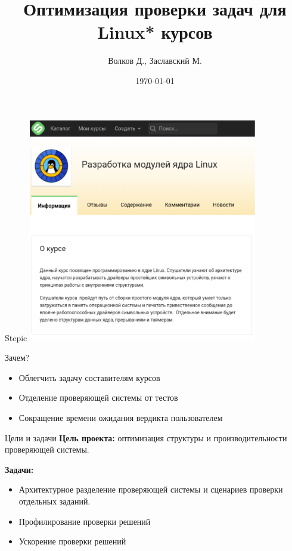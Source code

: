 \documentclass{beamer}
\begin{document}
\title{Оптимизация проверки задач для Linux* курсов}  
\author{Волков Д., Заславский М.}
\date{\today} 
\frame{\titlepage} 

\begin{frame}{Stepic}
	\includegraphics[width=100mm]{./stepic.pdf}
\end{frame}

\begin{frame}{Зачем?}
	\begin{itemize}
		\item Облегчить задачу составителям курсов
		\item Отделение проверяющей системы от тестов
		\item Сокращение времени ожидания вердикта пользователем
	\end{itemize}
\end{frame}

\begin{frame}{Цели и задачи}
	\textbf{Цель проекта:} оптимизация структуры и производительности проверяющей системы.

	\textbf{Задачи:}
	\begin{itemize}
		\item Архитектурное разделение проверяющей системы и сценариев проверки отдельных заданий.
		\item Профилирование проверки решений
		\item Ускорение проверки решений 
	\end{itemize}
\end{frame}
\end{document}
